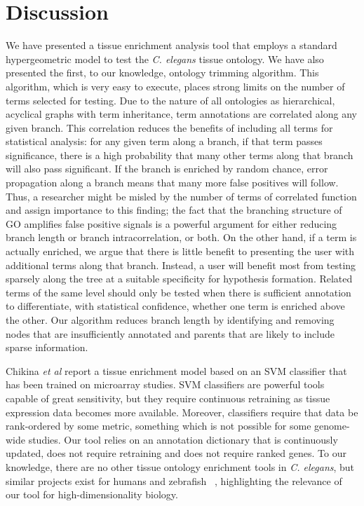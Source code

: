 \documentclass[linenumbers, doublespacing]{bmcart}
\begin{document}
\section*{Discussion}
We have presented a tissue enrichment analysis tool that employs a standard hypergeometric model to test the \emph{C. elegans} tissue ontology. We have also presented the first, to our knowledge, ontology trimming algorithm. This algorithm, which is very easy to execute, places strong limits on the number of terms selected for testing. Due to the nature of all ontologies as hierarchical, acyclical graphs with term inheritance, term annotations are correlated along any given branch. This correlation reduces the benefits of including all terms for statistical analysis: for any given term along a branch, if that term passes significance, there is a high probability that many other terms along that branch will also pass significant. If the branch is enriched by random chance, error propagation along a branch means that many more false positives will follow. Thus, a researcher might be misled by the number of terms of correlated function and assign importance to this finding; the fact that the branching structure of GO amplifies false positive signals is a powerful argument for either reducing branch length or branch intracorrelation, or both. On the other hand, if a term is actually enriched, we argue that there is little benefit to presenting the user with additional terms along that branch. Instead, a user will benefit most from testing sparsely along the tree at a suitable specificity for hypothesis formation. Related terms of the same level should only be tested when there is sufficient annotation to differentiate, with statistical confidence, whether one term is enriched above the other. Our algorithm reduces branch length by identifying and removing nodes that are insufficiently annotated and parents that are likely to include sparse information.

Chikina \emph{et al}  \cite{Chikina2009} report a tissue enrichment model based on an SVM classifier that has been trained on microarray studies. SVM classifiers are powerful tools capable of great sensitivity, but they require continuous retraining as tissue expression data becomes more available. Moreover, classifiers require that data be rank-ordered by some metric, something which is not possible for some genome-wide studies. Our tool relies on an annotation dictionary that is continuously updated, does not require retraining and does not require ranked genes. To our knowledge, there are no other tissue ontology enrichment tools in \emph{C. elegans}, but similar projects exist for humans and zebrafish ~\cite{Lee2013, Prykhozhij2013}, highlighting the relevance of our tool for high-dimensionality biology.
\end{document}
